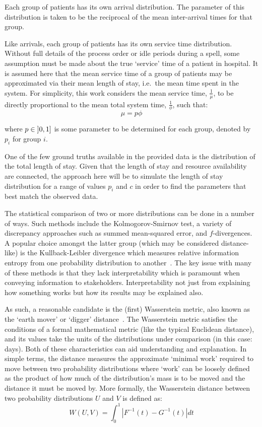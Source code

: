 Each group of patients has its own arrival distribution. The parameter of this
distribution is taken to be the reciprocal of the mean inter-arrival times for
that group.

Like arrivals, each group of patients has its own service time distribution.
Without full details of the process order or idle periods during a spell, some
assumption must be made about the true `service' time of a patient in hospital.
It is assumed here that the mean service time of a group of patients may be
approximated via their mean length of stay, i.e.\ the mean time spent in the
system. For simplicity, this work considers the mean service time,
\(\frac{1}{\mu}\), to be directly proportional to the mean total system time,
\(\frac{1}{\phi}\), such that:
\begin{equation}
    \mu = p \phi
\end{equation}

\noindent where \(p \in \interval[open left]{0}{1}\) is some parameter to be
determined for each group, denoted by \(p_i\) for group \(i\).

One of the few ground truths available in the provided data is the distribution
of the total length of stay. Given that the length of stay and resource
availability are connected, the approach here will be to simulate the length of
stay distribution for a range of values \(p_i\) and \(c\) in order to find the
parameters that best match the observed data.

The statistical comparison of two or more distributions can be done in a number
of ways. Such methods include the Kolmogorov-Smirnov test, a variety of
discrepancy approaches such as summed mean-squared error, and \(f\)-divergences.
A popular choice amongst the latter group (which may be considered
distance-like) is the Kullback-Leibler divergence which measures relative
information entropy from one probability distribution to
another~\cite{Kullback1951}. The key issue with many of these methods is that
they lack interpretability which is paramount when conveying information to
stakeholders. Interpretability not just from explaining how something works but
how its results may be explained also.

As such, a reasonable candidate is the (first) Wasserstein metric, also known as
the `earth mover' or `digger' distance~\cite{Vaserstein1969}. The Wasserstein
metric satisfies the conditions of a formal mathematical metric (like the
typical Euclidean distance), and its values take the units of the distributions
under comparison (in this case: days). Both of these characteristics can aid
understanding and explanation. In simple terms, the distance measures the
approximate `minimal work' required to move between two probability
distributions where `work' can be loosely defined as the product of how much of
the distribution's mass is to be moved and the distance it must be moved
by. More formally, the Wasserstein distance between two probability
distributions \(U\) and \(V\) is defined as:
\begin{equation}\label{eq:wasserstein}
    W(U, V) = \int_{0}^{1} \left\vert F^{-1}(t) - G^{-1}(t) \right\vert dt
\end{equation}

